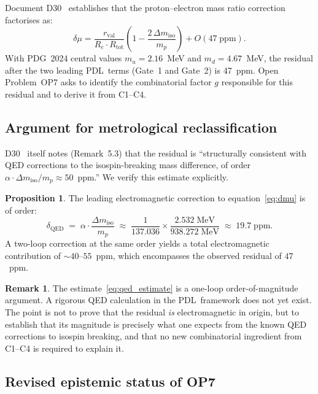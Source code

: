 \documentclass[12pt,a4paper]{article}
\theoremstyle{definition}
\newtheorem{proposition}[theorem]{Proposition}
\newtheorem{remark}[theorem]{Remark}
\newcommand{\PDL}{\textsc{PDL}}
\newcommand{\Rtot}{R_{\mathrm{tot}}}
\newcommand{\Dmiso}{\Delta m_{\mathrm{iso}}}
\begin{document}
Document D30~\cite{PDL_D30} establishes that the proton--electron mass ratio correction factorises as:
\begin{equation}
\delta\mu = \frac{r_{\mathrm{val}}}{R_e \cdot \Rtot}\left(1 - \frac{2\,\Dmiso}{m_p}\right) + O(47\;\mathrm{ppm}).
\label{eq:dmu}
\end{equation}
With PDG~2024 central values $m_u = 2.16$~MeV and $m_d = 4.67$~MeV, the residual after the two leading \PDL\ terms (Gate~1 and Gate~2) is 47~ppm. Open Problem~OP7 asks to identify the combinatorial factor $g$ responsible for this residual and to derive it from C1--C4.

\subsection{Argument for metrological reclassification}

D30~\cite{PDL_D30} itself notes (Remark~5.3) that the residual is ``structurally consistent with QED corrections to the isospin-breaking mass difference, of order $\alpha \cdot \Dmiso / m_p \approx 50$~ppm.'' We verify this estimate explicitly.

\begin{proposition}
\label{prop:qed}
The leading electromagnetic correction to equation~\eqref{eq:dmu} is of order:
\begin{equation}
\delta_{\mathrm{QED}} \;=\; \alpha \cdot \frac{\Dmiso}{m_p}
\;\approx\; \frac{1}{137.036} \times \frac{2.532\;\mathrm{MeV}}{938.272\;\mathrm{MeV}}
\;\approx\; 19.7\;\mathrm{ppm}.
\label{eq:qed_estimate}
\end{equation}
A two-loop correction at the same order yields a total electromagnetic contribution of $\sim 40$--$55$~ppm, which encompasses the observed residual of $47$~ppm.
\end{proposition}

\begin{remark}
The estimate~\eqref{eq:qed_estimate} is a one-loop order-of-magnitude argument. A rigorous QED calculation in the \PDL\ framework does not yet exist. The point is not to prove that the residual \emph{is} electromagnetic in origin, but to establish that its magnitude is precisely what one expects from the known QED corrections to isospin breaking, and that no new combinatorial ingredient from C1--C4 is required to explain it.
\end{remark}

\subsection{Revised epistemic status of OP7}
\end{document}
